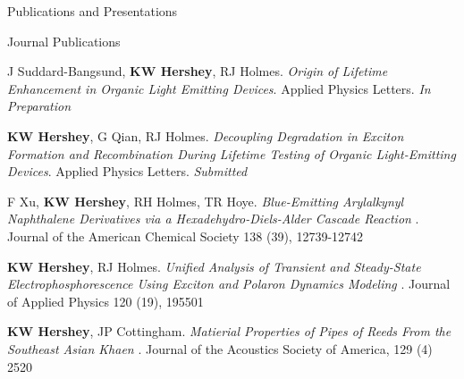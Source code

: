 \documentclass{resume} %
\begin{document}

\begin{rSection}{Publications and Presentations}
\begin{rSubsection}{Journal Publications}{}{}{}
\item J Suddard-Bangsund, \textbf{KW Hershey}, RJ Holmes. {\em Origin of Lifetime Enhancement in Organic Light Emitting Devices}. Applied Physics Letters. {\em In Preparation}
\item  \textbf{KW Hershey}, G Qian, RJ Holmes. {\em Decoupling Degradation in Exciton Formation and Recombination During Lifetime Testing of Organic Light-Emitting Devices}. Applied Physics Letters. {\em Submitted}
\item F Xu, \textbf{KW Hershey}, RH Holmes, TR Hoye. {\em Blue-Emitting Arylalkynyl Naphthalene Derivatives via a Hexadehydro-Diels-Alder Cascade Reaction} . Journal of the American Chemical Society 138 (39), 12739-12742
\item \textbf{KW Hershey}, RJ Holmes. {\em Unified Analysis of Transient and Steady-State Electrophosphorescence Using Exciton and Polaron Dynamics Modeling} . Journal of Applied Physics 120 (19), 195501
\item \textbf{KW Hershey}, JP Cottingham. {\em Matierial Properties of Pipes of Reeds From the Southeast Asian Khaen} . Journal of the Acoustics Society of America, 129 (4) 2520

\end{rSubsection}



\end{rSection}
\end{document}
